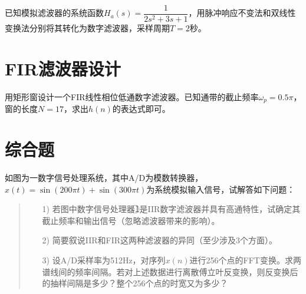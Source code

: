\documentclass[cn, hazy, blue, normal, 14pt]{elegantnote}
\begin{document}
\begin{exercise}

已知模拟滤波器的系统函数$H_a(s)=\dfrac{1}{2s^2+3s+1}$，用脉冲响应不变法和双线性变换法分别将其转化为数字滤波器，采样周期$T=2$秒。

\end{exercise}

\begin{solution}[print=true]
    


\end{solution}


\section{FIR滤波器设计}

\begin{exercise}

用矩形窗设计一个FIR线性相位低通数字滤波器。已知通带的截止频率$\omega_p=0.5\pi$，窗的长度$N=17$，求出$h(n)$的表达式即可。

\end{exercise}

\begin{solution}[print=true]



\end{solution}


\section{综合题}

\begin{exercise}

如图为一数字信号处理系统，其中A/D为模数转换器，$x(t)=\sin(200\pi t)+\sin(300\pi t)$为系统模拟输入信号，试解答如下问题：

\begin{center}
\end{center}

\begin{quote}
\begin{itemize}
    \item[1)] 若图中数字信号处理器\textcircled{1}是IIR数字滤波器并具有高通特性，试确定其截止频率和输出信号（忽略滤波器带来的影响）。
    \item[2)] 简要叙说IIR和FIR这两种滤波器的异同（至少涉及3个方面）。
    \item[3)] 设A/D采样率为512Hz，对序列$x(n)$进行256个点的FFT变换。求两谱线间的频率间隔。若对上述数据进行离散傅立叶反变换，则反变换后的抽样间隔是多少？整个256个点的时宽又为多少？
\end{itemize}
\end{quote}

\end{exercise}

\begin{solution}[print=true]



\end{solution}
\end{document}
